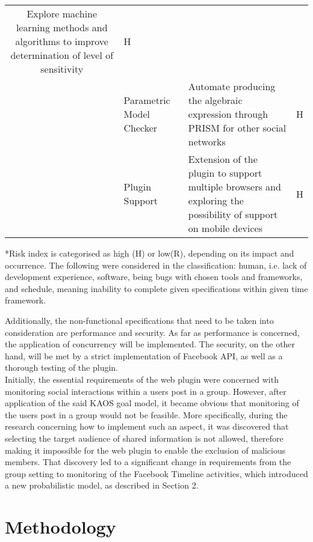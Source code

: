 \documentclass[a4paper,11pt]{article}
\begin{document}
\begin{table}[H]
\begin{tabular}{|c|M{4cm}|m{9.5cm}|c|}
Explore machine learning methods and algorithms to improve determination of level of sensitivity&H\\[2ex]
& Parametric Model Checker &
Automate  producing the algebraic expression through PRISM for other social networks&H\\[2ex]
& Plugin Support&
Extension of the plugin to support multiple browsers and exploring the possibility of support on mobile devices&H\\[2ex]
\hline
 \end{tabular}
*Risk index is categorised as high (H) or low(R), depending on its impact and occurrence. The following were considered in the classification: human, i.e. lack of development experience, software, being bugs with chosen tools and frameworks, and schedule, meaning inability to complete given specifications within given time framework.
 \end{table}
\indent Additionally, the non-functional specifications that need to be taken into consideration are performance and security. As far as performance is concerned, the application of concurrency will be implemented. The security, on the other hand, will be met by a strict implementation of Facebook API, as well as a thorough testing of the plugin. 
\\
\indent Initially, the essential requirements of the web plugin were concerned with monitoring social interactions within a user\textquotesingle s post in a group. However, after application of the said KAOS goal model, it became obvious that monitoring of the user\textquotesingle s post in a group would not be feasible. More specifically, during the research concerning how to implement such an aspect, it was discovered that selecting the target audience of shared information is not allowed, therefore making it impossible for the web plugin to enable the exclusion of malicious members. That discovery led to a significant change in requirements from the group setting to monitoring of the Facebook Timeline activities, which introduced a new probabilistic model, as described in Section 2.

\section{Methodology}
\end{document}
